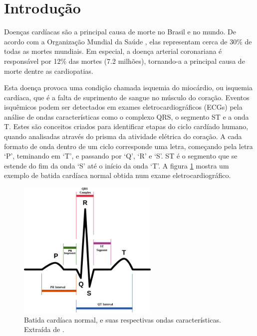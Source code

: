 
\section{Introdução}
\label{sec:section1}

Doenças cardíacas são a principal causa de morte no Brasil e no mundo. De acordo com a Organização Mundial da Saúde \cite{Who04}, elas representam cerca de 30\% de todas as mortes mundiais. Em especial, a doença arterial coronariana é responsável por 12\% das mortes (7.2 milhões), tornando-a a principal causa de morte dentre as cardiopatias.

Esta doença provoca uma condição chamada isquemia do miocárdio, ou isquemia cardíaca, que é a falta de suprimento de sangue no músculo do coração. Eventos isquêmicos podem ser detectados em exames eletrocardiográficos (ECGs) pela análise de ondas características como o complexo QRS, o segmento ST e a onda T. Estes são conceitos criados para identificar etapas do ciclo cardíado humano, quando analisadas através do prisma da atividade elétrica do coração. A cada formato de onda dentro de um ciclo corresponde uma letra, começando pela letra `P', teminando em `T', e passando por `Q', `R' e `S'. ST é o segmento que se estende do fim da onda `S' até o início da onda `T'. A figura \ref{fig:normal_beat} mostra um exemplo de batida cardíaca normal obtida num exame eletrocardiográfico.

\begin{figure}[ht]
    \centering
    \includegraphics[width=0.6\textwidth]{figures/normal_beat.png}
    \caption{Batida cardíaca normal, e suas respectivas ondas características. Extraída de \cite{WikiSTSeg13}.}
    \label{fig:normal_beat}
\end{figure}


